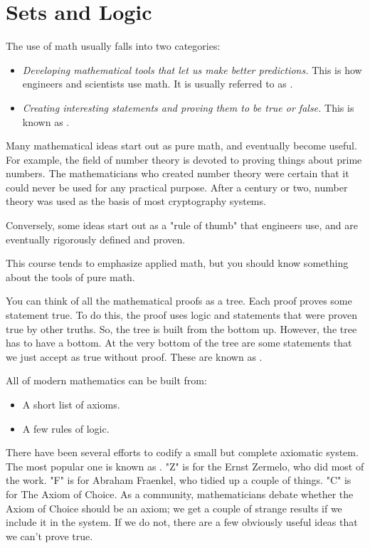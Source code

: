 \chapter{Sets and Logic}

The use of math usually falls into two categories:
\begin{itemize}
\item \textit{Developing mathematical tools that let us make better predictions.}  This is how engineers and scientists use math.  It is usually referred to as .
\item \textit{Creating interesting statements and proving them to be true or false.}  This is known as .
\end{itemize}

Many mathematical ideas start out as pure math, and eventually
become useful. For example, the field of number theory is devoted to
proving things about prime numbers.  The mathematicians who created
number theory were certain that it could never be used for any
practical purpose.  After a century or two, number theory was used as
the basis of most cryptography systems.

Conversely, some ideas start out as a "rule of thumb" that engineers use, and are
eventually rigorously defined and proven.

This course tends to emphasize applied math, but you should know
something about the tools of pure math.

You can think of all the mathematical proofs as a tree. Each proof
proves some statement true. To do this, the proof uses logic and
statements that were proven true by other truths. So, the tree is built
from the bottom up.  However, the tree has to have a bottom. At the
very bottom of the tree are some statements that we just accept as
true without proof.  These are known as .

All of modern mathematics can be built from:
\begin{itemize}
\item A short list of axioms.
\item A few rules of logic.
\end{itemize}

There have been several efforts to codify a small but complete
axiomatic system. The most popular one is known as .  "Z"
is for the Ernst Zermelo, who did most of the work.  "F" is for
Abraham Fraenkel, who tidied up a couple of things. "C" is for The
Axiom of Choice.  As a community, mathematicians debate whether the
Axiom of Choice should be an axiom; we get a couple of strange results
if we include it in the system.  If we do not, there are a few obviously
useful ideas that we can't prove true.

